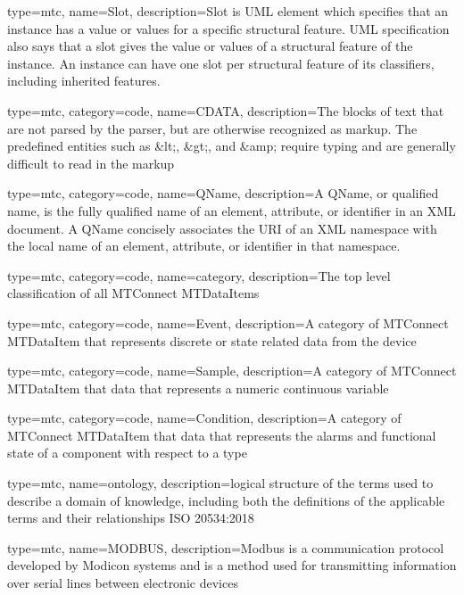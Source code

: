 {
  type=mtc,
  name=Slot,
  description={Slot is UML element which specifies that an instance has a value or values for a specific structural feature. UML specification also says that a slot gives the value or values of a structural feature of the instance. An instance can have one slot per structural feature of its classifiers, including inherited features.}
}

{
  type=mtc,
  category=code,
  name=CDATA,
  description={The blocks of text that are not parsed by the parser, but are otherwise recognized as markup. The predefined entities such as \&lt;, \&gt;, and \&amp; require typing and are generally difficult to read in the markup}
}

{
  type=mtc,
  category=code,
  name=QName,
  description={A QName, or qualified name, is the fully qualified name of an element, attribute, or identifier in an XML document. A QName concisely associates the URI of an XML namespace with the local name of an element, attribute, or identifier in that namespace.}
}

{
  type=mtc,
  category=code,
  name=category,
  description={The top level classification of all MTConnect \glspl{MTDataItem}}
}


{
  type=mtc,
  category=code,
  name=Event,
  description={A category of MTConnect \gls{MTDataItem} that represents discrete or state related data from the device}
}

{
  type=mtc,
  category=code,
  name=Sample,
  description={A category of MTConnect \gls{MTDataItem} that data that represents a numeric continuous variable}
}

{
  type=mtc,
  category=code,
  name=Condition,
  description={A category of MTConnect \gls{MTDataItem} that data that represents the alarms and functional state of a component with respect to a \gls{type}}
}

{
  type=mtc,
  name=ontology,
  description={logical structure of the terms used to describe a domain of knowledge, including both the definitions of the applicable terms and their relationships ISO 20534:2018}
}

{
  type=mtc,
  name=MODBUS,
  description={Modbus is a communication protocol developed by Modicon systems and is a method used for transmitting information over serial lines between electronic devices}
}

